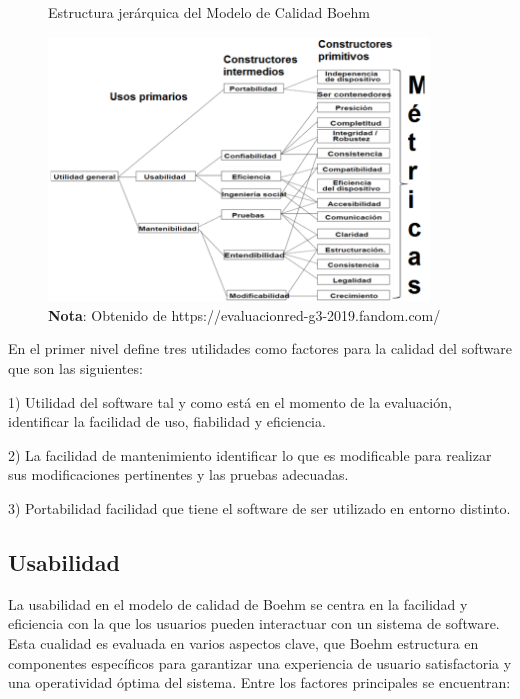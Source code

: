 		\begin{figure}[h] %
			\caption[Estructura jerárquica del Modelo de Calidad Boehm]
			{\newline Estructura jerárquica del Modelo de Calidad Boehm} %
			\vspace{0.3cm}
			\centering
			\includegraphics[width=0.9\textwidth]{imagenes/est_boehm.png} %
			\vspace{0.3cm}
			\caption*{\textup{\textbf{Nota}: Obtenido de https://evaluacionred-g3-2019.fandom.com/}}
			\vspace{-0.8cm}
			\label{fig:figura_est_boehm} %
		\end{figure}
		
		En el primer nivel define tres utilidades como factores para la calidad del software que son las siguientes: 
		
		1) Utilidad del software tal y como está en el momento de la evaluación, identificar la 
		facilidad de uso, fiabilidad y eficiencia.
		
		2) La facilidad de mantenimiento identificar lo que es modificable para realizar sus 
		modificaciones pertinentes y las pruebas adecuadas.
		
		3) Portabilidad facilidad que tiene el software de ser utilizado en entorno distinto.
		
		\subsection{Usabilidad}
		
		La usabilidad en el modelo de calidad de Boehm se centra en la facilidad y eficiencia con la que los usuarios pueden interactuar con un sistema de software. Esta cualidad es evaluada en varios aspectos clave, que Boehm estructura en componentes específicos para garantizar una experiencia de usuario satisfactoria y una operatividad óptima del sistema. Entre los factores principales se encuentran:
		
